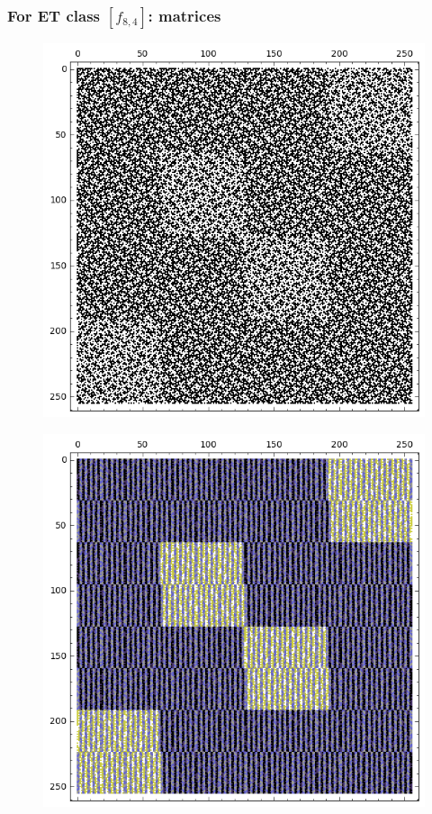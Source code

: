 \documentclass[pdf,sprung,slideColor,nocolorBG]{beamer}
\begin{document}
\begin{frame}
\frametitle{For ET class $[f_{8,4}]$: matrices}
\begin{figure}
\centering
\begin{minipage}{.48\textwidth}
  \centering
  \includegraphics[width=.9\linewidth]{../matrix_plot/c8_4_weight_class_matrix.png}
  \label{fig:8_4_weight_class_matrix}
\end{minipage}%
\begin{minipage}{.48\textwidth}
  \centering
  \includegraphics[width=.9\linewidth]{../matrix_plot/c8_4_bent_cayley_graph_index_matrix.png}
  \label{fig:8_4_bent_cayley_graph_index_matrix}
\end{minipage}
\end{figure}
\end{frame}
\end{document}
